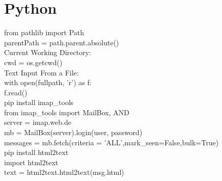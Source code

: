 \chapter{Python}\label{chap:Python}
from pathlib import Path\\
parentPath = path.parent.absolute()\medskip\\
Current Working Directory:\\
cwd = os.getcwd()\medskip\\
Text Input From a File:\\
with open(fullpath, 'r') as f:\\
f.read()\medskip\\
pip install imap\_tools\\
from imap\_tools import MailBox, AND\\
server = imap.web.de\\
mb = MailBox(server).login(user, password)\\
messages = mb.fetch(criteria = 'ALL',mark_seen=False,bulk=True)\\
pip install html2text\\
import html2text\\
text = html2text.html2text(msg.html)\\